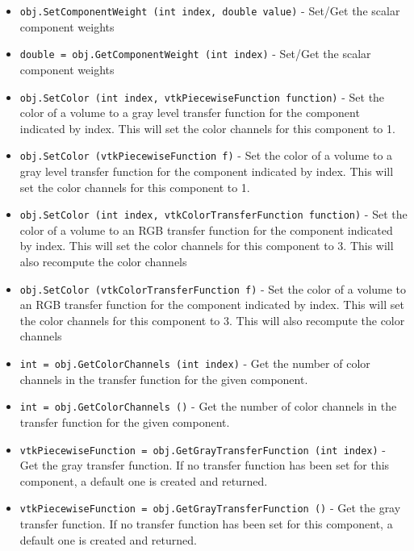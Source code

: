 \begin{itemize}
\item  \verb|obj.SetComponentWeight (int index, double value)| -  Set/Get the scalar component weights

\item  \verb|double = obj.GetComponentWeight (int index)| -  Set/Get the scalar component weights

\item  \verb|obj.SetColor (int index, vtkPiecewiseFunction function)| -  Set the color of a volume to a gray level transfer function
 for the component indicated by index. This will set the
 color channels for this component to 1.

\item  \verb|obj.SetColor (vtkPiecewiseFunction f)| -  Set the color of a volume to a gray level transfer function
 for the component indicated by index. This will set the
 color channels for this component to 1.

\item  \verb|obj.SetColor (int index, vtkColorTransferFunction function)| -  Set the color of a volume to an RGB transfer function
 for the component indicated by index. This will set the
 color channels for this component to 3.
 This will also recompute the color channels

\item  \verb|obj.SetColor (vtkColorTransferFunction f)| -  Set the color of a volume to an RGB transfer function
 for the component indicated by index. This will set the
 color channels for this component to 3.
 This will also recompute the color channels

\item  \verb|int = obj.GetColorChannels (int index)| -  Get the number of color channels in the transfer function
 for the given component.

\item  \verb|int = obj.GetColorChannels ()| -  Get the number of color channels in the transfer function
 for the given component.

\item  \verb|vtkPiecewiseFunction = obj.GetGrayTransferFunction (int index)| -  Get the gray transfer function.
 If no transfer function has been set for this component, a default one
 is created and returned.

\item  \verb|vtkPiecewiseFunction = obj.GetGrayTransferFunction ()| -  Get the gray transfer function.
 If no transfer function has been set for this component, a default one
 is created and returned.


\end{itemize}
